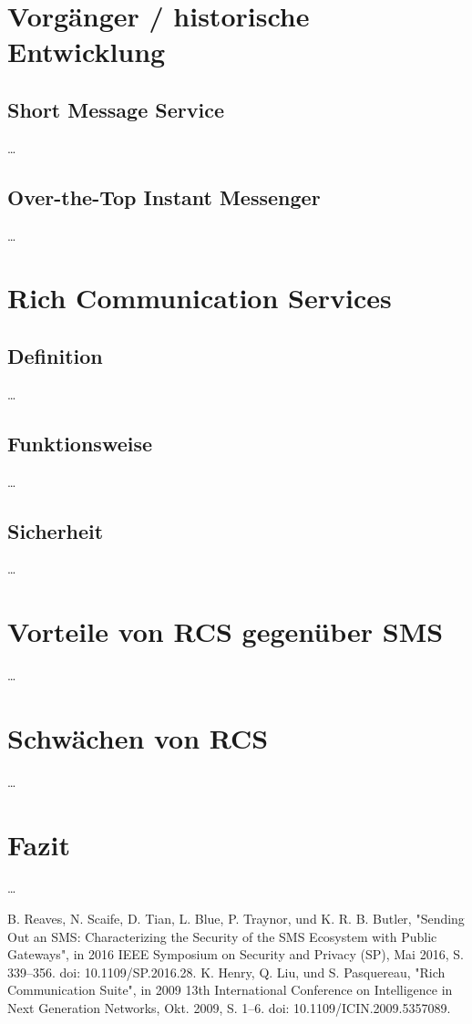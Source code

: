 \documentclass[conference]{IEEEtran}
\begin{document}
\section{Vorgänger / historische Entwicklung}

\subsection{Short Message Service}

\dots

\subsection{Over-the-Top Instant Messenger}

\dots

\section{Rich Communication Services}

\subsection{Definition}

\dots

\subsection{Funktionsweise}

\dots

\subsection{Sicherheit}

\dots

\section{Vorteile von RCS gegenüber SMS}

\dots

\section{Schwächen von RCS}

\dots

\section{Fazit}

\dots

\begin{thebibliography}{00}
     B. Reaves, N. Scaife, D. Tian, L. Blue, P. Traynor, und K. R. B. Butler, "Sending Out an SMS: Characterizing the Security of the SMS Ecosystem with Public Gateways", in 2016 IEEE Symposium on Security and Privacy (SP), Mai 2016, S. 339–356. doi: 10.1109/SP.2016.28.
     K. Henry, Q. Liu, und S. Pasquereau, "Rich Communication Suite", in 2009 13th International Conference on Intelligence in Next Generation Networks, Okt. 2009, S. 1–6. doi: 10.1109/ICIN.2009.5357089.
\end{thebibliography}
\end{document}
